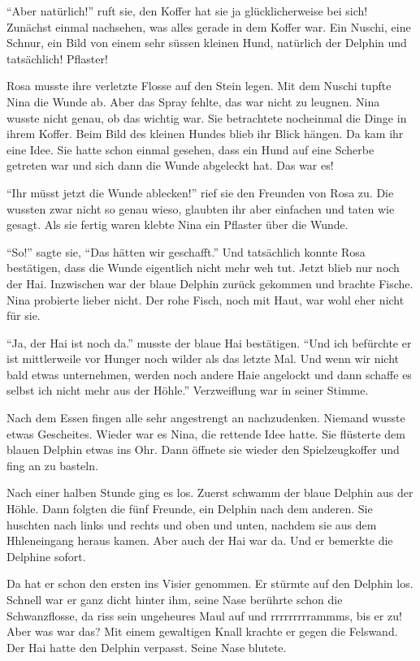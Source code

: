 \enquote{Aber natürlich!} ruft sie, den Koffer hat sie ja glücklicherweise bei sich! Zunächst einmal nachsehen, was alles gerade in dem Koffer war. Ein Nuschi, eine Schnur, ein Bild von einem sehr süssen kleinen Hund, natürlich der Delphin und tatsächlich! Pflaster! 

Rosa musste ihre verletzte Flosse auf den Stein legen. Mit dem Nuschi tupfte Nina die Wunde ab. Aber das Spray fehlte, das war nicht zu leugnen. Nina wusste nicht genau, ob das wichtig war. Sie betrachtete nocheinmal die Dinge in ihrem Koffer. Beim Bild des kleinen Hundes blieb ihr Blick hängen. Da kam ihr eine Idee. Sie hatte schon einmal gesehen, dass ein Hund auf eine Scherbe getreten war und sich dann die Wunde abgeleckt hat. Das war es!

\enquote{Ihr müsst jetzt die Wunde ablecken!} rief sie den Freunden von Rosa zu. Die wussten zwar nicht so genau wieso, glaubten ihr aber einfachen und taten wie gesagt. Als sie fertig waren klebte Nina ein Pflaster über die Wunde.

\enquote{So!} sagte sie, \enquote{Das hätten wir geschafft.} Und tatsächlich konnte Rosa bestätigen, dass die Wunde eigentlich nicht mehr weh tut. Jetzt blieb nur noch der Hai. Inzwischen war der blaue Delphin zurück gekommen und brachte Fische. Nina probierte lieber nicht. Der rohe Fisch, noch mit Haut, war wohl eher nicht für sie.

\enquote{Ja, der Hai ist noch da.} musste der blaue Hai bestätigen. \enquote{Und ich befürchte er ist mittlerweile vor Hunger noch wilder als das letzte Mal. Und wenn wir nicht bald etwas unternehmen, werden noch andere Haie angelockt und dann schaffe es selbst ich nicht mehr aus der Höhle.} Verzweiflung war in seiner Stimme.

Nach dem Essen fingen alle sehr angestrengt an nachzudenken. Niemand wusste etwas Gescheites. Wieder war es Nina, die rettende Idee hatte. Sie flüsterte dem blauen Delphin etwas ins Ohr. Dann öffnete sie wieder den Spielzeugkoffer und fing an zu basteln. 

Nach einer halben Stunde ging es los. Zuerst schwamm der blaue Delphin aus der Höhle. Dann folgten die fünf Freunde, ein Delphin nach dem anderen. Sie huschten nach links und rechts und oben und unten, nachdem sie aus dem Hhleneingang heraus kamen. Aber auch der Hai war da. Und er bemerkte die Delphine sofort.

Da hat er schon den ersten ins Visier genommen. Er stürmte auf den Delphin los. Schnell war er ganz dicht hinter ihm, seine Nase berührte schon die Schwanzflosse, da riss sein ungeheures Maul auf und rrrrrrrrrammms, bis er zu! Aber was war das? Mit einem gewaltigen Knall krachte er gegen die Felswand. Der Hai hatte den Delphin verpasst. Seine Nase blutete.

